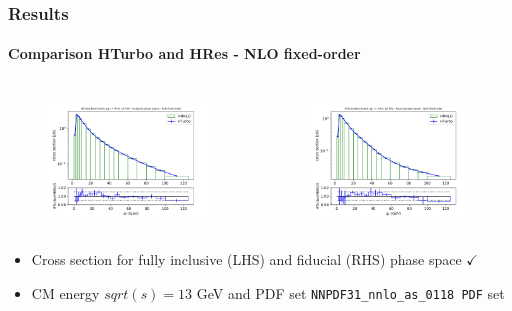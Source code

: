 \documentclass[aspectratio=43]{beamer}
\begin{document}
\begin{frame}
	
	\frametitle{Results}
	\framesubtitle{Comparison HTurbo and HRes - NLO fixed-order}
	
	\footnotesize
	
	\begin{columns}
		
		
		\begin{figure}
			\includegraphics[width = 7cm]{plots/part3/chapter6/nnlo-fo-1.png}
		\end{figure}
		
		
		\begin{figure}
			\includegraphics[width = 7cm]{plots/part3/chapter6/nnlo-fo-fid-1.png}
		\end{figure}
		
	\end{columns}
	
	\begin{itemize}
		\item Cross section for fully inclusive (LHS) and fiducial (RHS) phase space {\color{darkgreen}$\checkmark$} 
		\item CM energy $sqrt(s) = 13$ GeV and PDF set \texttt{NNPDF31\_nnlo\_as\_0118 PDF} set
	\end{itemize}

\end{frame}
\end{document}
